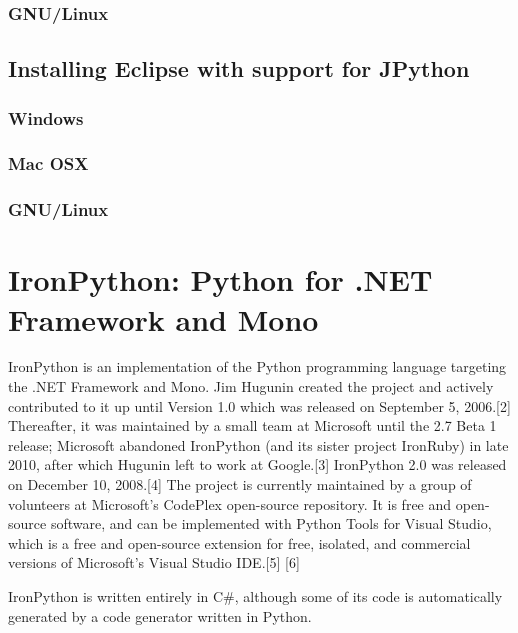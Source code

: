 \subsubsection{GNU/Linux}



\subsection{Installing Eclipse with support for JPython}


\subsubsection{Windows}

\subsubsection{Mac OSX}

\subsubsection{GNU/Linux}





\newpage
\section{IronPython: Python for .NET Framework and Mono}


IronPython is an implementation of the Python programming language targeting the .NET Framework and Mono. Jim Hugunin created the project and actively contributed to it up until Version 1.0 which was released on September 5, 2006.[2] Thereafter, it was maintained by a small team at Microsoft until the 2.7 Beta 1 release; Microsoft abandoned IronPython (and its sister project IronRuby) in late 2010, after which Hugunin left to work at Google.[3] IronPython 2.0 was released on December 10, 2008.[4] The project is currently maintained by a group of volunteers at Microsoft's CodePlex open-source repository. It is free and open-source software, and can be implemented with Python Tools for Visual Studio, which is a free and open-source extension for free, isolated, and commercial versions of Microsoft's Visual Studio IDE.[5] [6]

IronPython is written entirely in C\#, although some of its code is automatically generated by a code generator written in Python.

